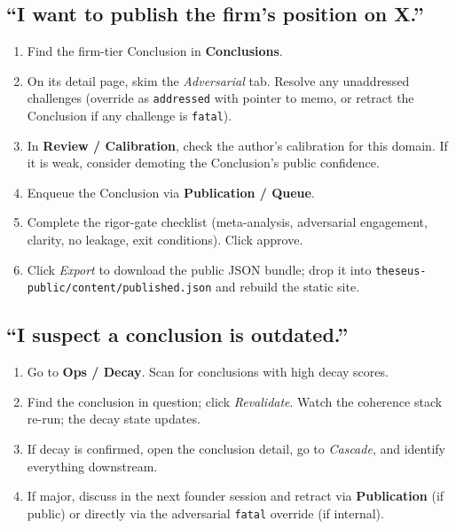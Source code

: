 \documentclass[11pt,letterpaper]{article}
\newcommand{\file}[1]{\texttt{#1}}
\newcommand{\page}[1]{\textbf{#1}}
\newcommand{\tab}[1]{\textsl{#1}}
\begin{document}
\subsection{``I want to publish the firm's position on X.''}
\begin{enumerate}[leftmargin=*,itemsep=0.2em]
  \item Find the firm-tier Conclusion in \page{Conclusions}.
  \item On its detail page, skim the \tab{Adversarial} tab. Resolve any unaddressed challenges (override as \texttt{addressed} with pointer to memo, or retract the Conclusion if any challenge is \texttt{fatal}).
  \item In \page{Review / Calibration}, check the author's calibration for this domain. If it is weak, consider demoting the Conclusion's public confidence.
  \item Enqueue the Conclusion via \page{Publication / Queue}.
  \item Complete the rigor-gate checklist (meta-analysis, adversarial engagement, clarity, no leakage, exit conditions). Click approve.
  \item Click \tab{Export} to download the public JSON bundle; drop it into \file{theseus-public/content/published.json} and rebuild the static site.
\end{enumerate}

\subsection{``I suspect a conclusion is outdated.''}
\begin{enumerate}[leftmargin=*,itemsep=0.2em]
  \item Go to \page{Ops / Decay}. Scan for conclusions with high decay scores.
  \item Find the conclusion in question; click \tab{Revalidate}. Watch the coherence stack re-run; the decay state updates.
  \item If decay is confirmed, open the conclusion detail, go to \tab{Cascade}, and identify everything downstream.
  \item If major, discuss in the next founder session and retract via \page{Publication} (if public) or directly via the adversarial \texttt{fatal} override (if internal).
\end{enumerate}
\end{document}
